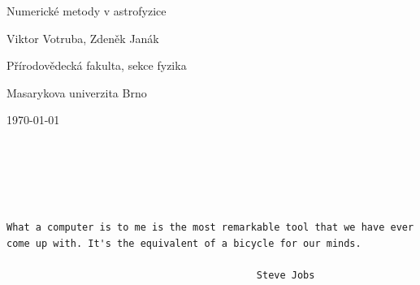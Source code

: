 \documentclass[12pt,a4paper,twoside]{report}
\begin{document}
\pagestyle{fancyplain}

\begin{titlepage}
\begin{center}
\vspace*{1in}
{\LARGE \sffamily Numerické metody v astrofyzice}
\par
\vspace{1.5in}
{\large Viktor Votruba, Zdeněk Janák}
\par
\vfill
\par
\vspace{0.5in}
Přírodovědecká fakulta, sekce fyzika
\par
\vspace{0.5in}
Masarykova univerzita Brno
\par
\vspace{0.5in}
\today
\end{center}
\end{titlepage}

\thispagestyle{empty}
\begin{figure}[t!]
\begin{flushright}
\end{flushright}
\end{figure}
\begin{verbatim}





What a computer is to me is the most remarkable tool that we have ever
come up with. It's the equivalent of a bicycle for our minds.
                  
		                                   Steve Jobs


\end{verbatim}

\tableofcontents
\thispagestyle{empty}










\end{document}

